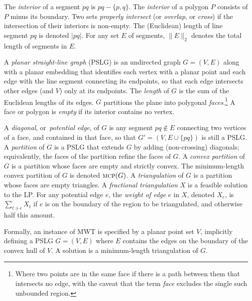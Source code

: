 \documentclass[final]{siamltex}
\newcommand{\MCP}{\text{\sc mcp}}
\renewcommand{\overline}[1]{{#1}}
\newcommand{\edge}{e}
\newcommand{\edges}{E}
\newcommand{\graph}{G}
\newcommand{\polygon}{P}
\newcommand{\tri}{t}  \newcommand{\vertex}{v}
\newcommand{\vertices}{V}
\newcommand{\fracTriang}{X}
\begin{document}
\smallskip
\begin{definition}
The {\em interior} of a segment $\overline{p q}$ is $\overline{p q}-\{p,q\}$.
The {\em interior} of a polygon $\polygon$ consists of $\polygon$ minus its boundary.
Two sets {\em properly intersect} (or {\em overlap}, or {\em cross}) 
if the intersection of their interiors is non-empty.
The (Euclidean) length of line segment $\overline{p q}$ is denoted $|\overline{p q}|$.
For any set $\edges$ of segments, 
$\|\edges\|_2$ denotes the total length of segments in $\edges$. 

A {\em planar straight-line graph} (PSLG) is an undirected graph $\graph=(\vertices,\edges)$
along with a planar embedding that identifies each vertex with a planar point
and each edge with the line segment connecting its endpoints,
so that each edge intersects other edges (and $\vertices$) only at its endpoints.
The {\em length} of $\graph$ is the sum of the Euclidean lengths of its edges.
$\graph$ partitions the plane into polygonal {\em faces}.\footnote
{Where two points are in the same face if there is a path between them that intersects no edge,
with the caveat that the term {\em face} excludes the single such unbounded region.}
A face or polygon is {\em empty} if its interior contains no vertex.

A {\em diagonal}, or~{\em potential edge}, of $\graph$ 
is any segment $\overline{p q}\not\in \edges$ connecting two vertices of a face,
and contained in that face, so that $\graph'=(\vertices,\edges\cup\{\overline{p q}\})$ is still a PSLG.
A {\em partition} of $\graph$ is a PSLG that extends $\graph$ by adding (non-crossing) diagonals;
equivalently, the faces of the partition refine the faces of $\graph$.
A {\em convex partition} of $\graph$ is a partition whose faces are empty and strictly convex.
The minimum-length convex partition of $\graph$ is denoted $\MCP(\graph)$.
A {\em triangulation} of $\graph$ is a partition whose faces are empty triangles.
A {\em fractional triangulation} $\fracTriang$ is a feasible solution to the LP.
For any potential edge $\edge$, the {\em weight of edge} $\edge$ in $\fracTriang$, denoted $\fracTriang_\edge$, 
is $\sum_{\tri\ni\edge} \fracTriang_\tri$ if $\edge$ is on
the boundary of the region to be triangulated, and otherwise half this amount.



Formally, an instance of MWT is specified by a planar point set $\vertices$,
implicitly defining a PSLG $\graph=(\vertices,\edges)$ where $\edges$ contains the edges 
on the boundary of the convex hull of $\vertices$.
A solution is a minimum-length triangulation of $\graph$.
\end{definition}
\end{document}
